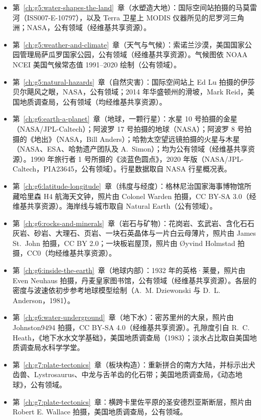 \begin{itemize}
  \item 第~\ref{ch:g5:water-shapes-the-land}~章（水塑造大地）：国际空间站拍摄的马莫雷河（ISS007-E-10797），以及 Terra 卫星上 MODIS 仪器所见的尼罗河三角洲；NASA，公有领域（经维基共享资源）。
  \item 第~\ref{ch:g5:weather-and-climate}~章（天气与气候）：索诺兰沙漠，美国国家公园管理局萨瓜罗国家公园，公有领域（经维基共享资源）。气候图依 NOAA NCEI 美国气候常态值 1991--2020 绘制（公有领域）。
  \item 第~\ref{ch:g5:natural-hazards}~章（自然灾害）：国际空间站上 Ed Lu 拍摄的伊莎贝尔飓风之眼，NASA，公有领域；2014 年华盛顿州的滑坡，Mark Reid，美国地质调查局，公有领域（均经维基共享资源）。
  \item 第~\ref{ch:g6:earth-a-planet}~章（地球，一颗行星）：水星 10 号拍摄的金星（NASA/JPL-Caltech）；阿波罗 17 号拍摄的地球（NASA）；阿波罗 8 号拍摄的《地出》（NASA，Bill Anders）；哈勃太空望远镜拍摄的火星与木星（NASA、ESA、哈勃遗产团队及 A.~Simon）；均为公有领域（经维基共享资源）。1990 年旅行者 1 号所摄的《淡蓝色圆点》，2020 年版（NASA/JPL-Caltech，PIA23645，公有领域）。行星数据取自 NASA 行星概况表。
  \item 第~\ref{ch:g6:latitude-longitude}~章（纬度与经度）：格林尼治国家海事博物馆所藏哈里森 H4 航海天文钟，照片由 Colonel Warden 拍摄，CC BY-SA 3.0（经维基共享资源）。海岸线与城市取自 Natural Earth（公有领域）。
  \item 第~\ref{ch:g6:rocks-and-minerals}~章（岩石与矿物）：花岗岩、玄武岩、含化石石灰岩、砂岩、大理石、页岩、一块石英晶体与一片白云母薄片，照片由 James St.~John 拍摄，CC BY 2.0；一块板岩屋顶，照片由 Øyvind Holmstad 拍摄，CC0（均经维基共享资源）。
  \item 第~\ref{ch:g6:inside-the-earth}~章（地球内部）：1932 年的英格·莱曼，照片由 Even Neuhaus 拍摄，丹麦皇家图书馆，公有领域（经维基共享资源）。各层的密度与波速依初步参考地球模型绘制（A.~M. Dziewonski 与 D.~L. Anderson，1981）。
  \item 第~\ref{ch:g6:water-underground}~章（地下水）：密苏里州的大泉，照片由 Johnston9494 拍摄，CC BY-SA 4.0（经维基共享资源）。孔隙度引自 R.~C. Heath，《地下水水文学基础》，美国地质调查局（1983）；淡水占比取自美国地质调查局水科学学堂。
  \item 第~\ref{ch:g7:plate-tectonics}~章（板块构造）：重新拼合的南方大陆，并标示出犬齿兽、Lystrosaurus、中龙与舌羊齿的化石带；美国地质调查局，《动态地球》，公有领域。
  \item 第~\ref{ch:g7:plate-tectonics}~章：横跨卡里佐平原的圣安德烈亚斯断层，照片由 Robert E. Wallace 拍摄，美国地质调查局，公有领域。

\end{itemize}
